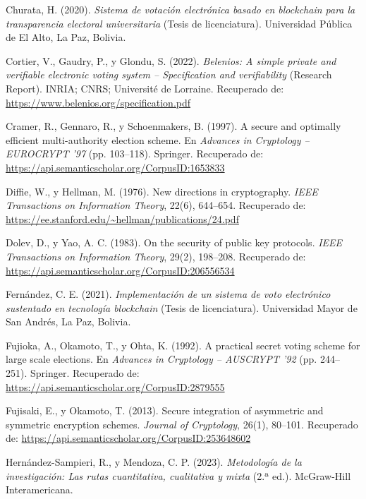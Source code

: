 \begin{flushleft}
	\hangindent=1.25cm
	Churata, H. (2020). \textit{Sistema de votación electrónica basado en blockchain para la transparencia electoral universitaria} (Tesis de licenciatura). Universidad Pública de El Alto, La Paz, Bolivia.

	\hangindent=1.25cm
	Cortier, V., Gaudry, P., y Glondu, S. (2022). \textit{Belenios: A simple private and verifiable electronic voting system -- Specification and verifiability} (Research Report). INRIA; CNRS; Université de Lorraine. Recuperado de: \url{https://www.belenios.org/specification.pdf}

	\hangindent=1.25cm
	Cramer, R., Gennaro, R., y Schoenmakers, B. (1997). A secure and optimally efficient multi-authority election scheme. En \textit{Advances in Cryptology -- EUROCRYPT '97} (pp. 103--118). Springer. Recuperado de: \url{https://api.semanticscholar.org/CorpusID:1653833}

	\hangindent=1.25cm
	Diffie, W., y Hellman, M. (1976). New directions in cryptography. \textit{IEEE Transactions on Information Theory}, 22(6), 644--654. Recuperado de: \url{https://ee.stanford.edu/~hellman/publications/24.pdf}

	\hangindent=1.25cm
	Dolev, D., y Yao, A. C. (1983). On the security of public key protocols. \textit{IEEE Transactions on Information Theory}, 29(2), 198--208. Recuperado de: \url{https://api.semanticscholar.org/CorpusID:206556534}

	\hangindent=1.25cm
	Fernández, C. E. (2021). \textit{Implementación de un sistema de voto electrónico sustentado en tecnología blockchain} (Tesis de licenciatura). Universidad Mayor de San Andrés, La Paz, Bolivia.

	\hangindent=1.25cm
	Fujioka, A., Okamoto, T., y Ohta, K. (1992). A practical secret voting scheme for large scale elections. En \textit{Advances in Cryptology -- AUSCRYPT '92} (pp. 244--251). Springer. Recuperado de: \url{https://api.semanticscholar.org/CorpusID:2879555}

	\hangindent=1.25cm
	Fujisaki, E., y Okamoto, T. (2013). Secure integration of asymmetric and symmetric encryption schemes. \textit{Journal of Cryptology}, 26(1), 80--101. Recuperado de: \url{https://api.semanticscholar.org/CorpusID:253648602}

	\hangindent=1.25cm
	Hernández-Sampieri, R., y Mendoza, C. P. (2023). \textit{Metodología de la investigación: Las rutas cuantitativa, cualitativa y mixta} (2.ª ed.). McGraw-Hill Interamericana.


\end{flushleft}
